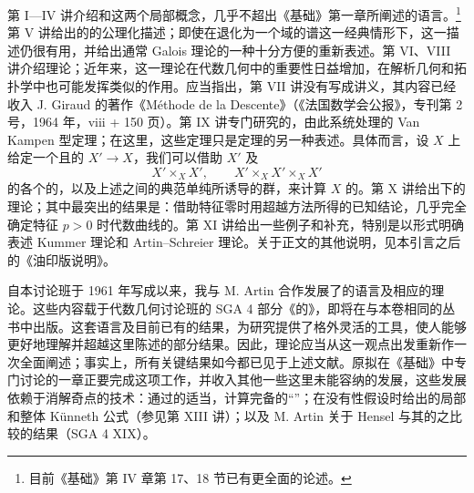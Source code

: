 第 I—IV 讲介绍和这两个局部概念，几乎不超出《基础》第一章所阐述的语言。\footnote{目前《基础》第 IV 章第 17、18 节已有更全面的论述。}第 V 讲给出的的公理化描述；即使在退化为一个域的谱这一经典情形下，这一描述仍很有用，并给出通常 Galois 理论的一种十分方便的重新表述。第 VI、VIII 讲介绍理论；近年来，这一理论在代数几何中的重要性日益增加，在解析几何和拓扑学中也可能发挥类似的作用。应当指出，第 VII 讲没有写成讲义，其内容已经收入 J. Giraud 的著作《Méthode de la Descente》（《法国数学会公报》，专刊第 2 号，1964 年，viii + 150 页）。第 IX 讲专门研究的，由此系统处理的 Van Kampen 型定理；在这里，这些定理只是定理的另一种表述。具体而言，设 $X$ 上给定一个且的 $X'\to X$，我们可以借助 $X'$ 及
\[
X'\times_X X',\qquad X'\times_X X'\times_X X'
\]
的各个的，以及上述之间的典范单纯所诱导的群，来计算 $X$ 的。第 X 讲给出下的理论；其中最突出的结果是：借助特征零时用超越方法所得的已知结论，几乎完全确定特征 $p>0$ 时代数曲线的。第 XI 讲给出一些例子和补充，特别是以形式明确表述 Kummer 理论和 Artin–Schreier 理论。关于正文的其他说明，见本引言之后的《油印版说明》。

自本讨论班于 1961 年写成以来，我与 M. Artin 合作发展了的语言及相应的理论。这些内容载于代数几何讨论班的 SGA 4 部分《的》，即将在与本卷相同的丛书中出版。这套语言及目前已有的结果，为研究提供了格外灵活的工具，使人能够更好地理解并超越这里陈述的部分结果。因此，理论应当从这一观点出发重新作一次全面阐述；事实上，所有关键结果如今都已见于上述文献。原拟在《基础》中专门讨论的一章正要完成这项工作，并收入其他一些这里未能容纳的发展，这些发展依赖于消解奇点的技术：通过的适当，计算完备的“”；在没有性假设时给出的局部和整体 Künneth 公式（参见第 XIII 讲）；以及 M. Artin 关于 Hensel 与其的之比较的结果（SGA 4 XIX）。

